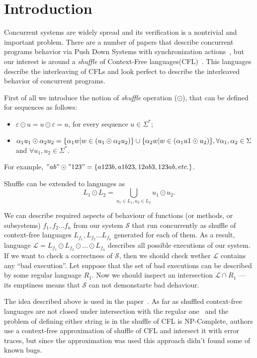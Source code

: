 \section{Introduction}

Concurrent systems are widely spread and its verification is a nontrivial and important problem.
There are a number of papers that describe concurrent programs behavior via Push Down Systems with synchronization actions~\cite{!!!}, but our interest is around a \textit{shuffle} of Context-Free languages(CFL)~\cite{!!!}.
This languages describe the interleaving of CFLs and look perfect to describe the interleaved behavior of concurrent programs.

First of all we introduce the notion of \textit{shuffle} operation ($\odot$), that can be defined for sequences as follows:
\begin{itemize}
    \item $\varepsilon \odot u = u \odot \varepsilon = {u}$, for every sequence $ u \in \Sigma^*$;
    \item $\alpha_1 u_1 \odot \alpha_2 u_2 = \{\alpha_1 w | w \in (u_1 \odot \alpha_2 u_2) \} \cup \newline
    \{\alpha_2 w | w \in (\alpha_1 u1 \odot u_2 ) \},  \forall \alpha_1, \alpha_2 \in \Sigma$ and $\forall u_1, u_2 \in \Sigma^*$.
\end{itemize}
For example, $"ab" \odot "123" = \{a123b,a1b23, 12ab3, 123ab, etc.\}$.

Shuffle can be extended to languages as $$L_1 \odot L_2 = \bigcup\limits_{u_1\in L_1, u_2\in L_2} u_1 \odot u_2.$$

We can describe required aspects of behaviour of functions (or methods, or subsystems) $f_1, f_2 ... f_n$ from our system $\mathcal{S}$ that run concurrently as shuffle of context-free languages $L_{f_1}, L_{f_2} ... L_{f_n}$ generated for each of them.
As a result, language  $\mathcal{L} = L_{f_1} \odot L_{f_2} \odot... \odot L_{f_n}$ describes all possible executions of our system.
If we want to check a correctness of $\mathcal{S}$, then we should check wether $\mathcal{L}$ contains any ``bad execution''.
Let suppose that the set of bad executions can be described by some regular language $R_1$.
Now we should inspect an intersection $\mathcal{L} \cap R_1$ --- its emptiness means that $\mathcal{S}$ can not demonstarte bad dehaviour.

The idea described above is used in the paper~\cite{stenman2011approximating}. 
As far as shuffled context-free languages are not closed under intersection with the regular one~\cite{!!!} and the problem of defining either string is in the shuffle of CFL is NP-Complete,
 authors use a context-free approximation of shuffle of CFL and intersect it with error traces, but since the approximation was used this approach didn't found some of known bugs. 

